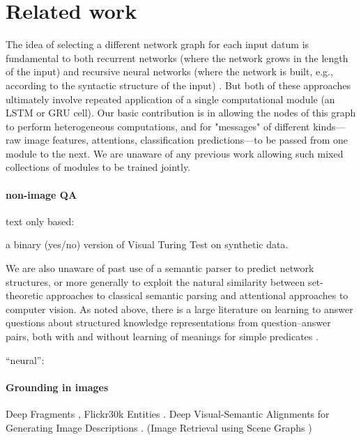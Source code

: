 \section{Related work}

The idea of selecting a different network graph for each input datum is fundamental to both recurrent networks (where the network grows in the length of the input) \cite{Elman90RNN} and recursive neural networks (where the network is built, e.g., according to the syntactic structure of the input) \cite{Socher13CVG}. But both of these approaches ultimately involve repeated application of a single computational module (\eg an LSTM \cite{} or GRU \cite{} cell). Our basic contribution is in allowing the nodes of this graph to perform heterogeneous computations, and for "messages" of different kinds---raw image features, attentions, classification predictions---to be passed from one module to the next. We are unaware of any previous work allowing such mixed collections of modules to be trained jointly. 

\paragraph{non-image QA}
text only based: \cite{berant14acl,Liang13DCS}

\cite{geman15nas} a binary (yes/no) version of Visual Turing Test on synthetic data.

We are also unaware of past use of a semantic parser to predict network structures, or more generally to exploit the natural similarity between set-theoretic approaches to classical semantic parsing and attentional approaches to computer vision. As noted above, there is a large literature on learning to answer questions about structured knowledge representations from question--answer pairs, both with and without learning of meanings for simple predicates \cite{Liang13DCS,Krish2013Grounded}.

``neural'': \cite{iyyer14emnlp,weston14arxiv}

\paragraph{Grounding in images}
Deep Fragments \cite{karpathy14nips}, Flickr30k Entities \cite{plummer15iccv}.
Deep Visual-Semantic Alignments for Generating Image Descriptions \cite{karpathy15cvpr}.
(Image Retrieval using Scene Graphs \cite{johnson15cvpr})

\cite{Krish2013Grounded,matuszek12icml,kong14cvpr}

